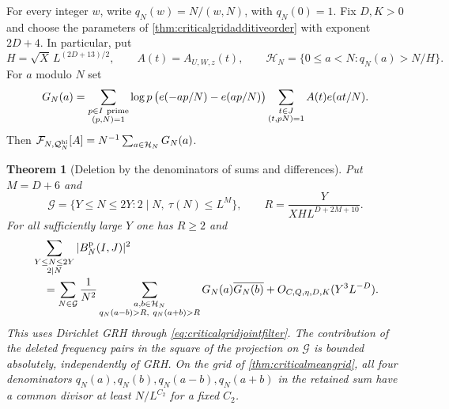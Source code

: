 \documentclass[11pt,a4paper]{article}
\numberwithin{equation}{section}
\newtheorem{theorem}{Theorem}[section]
\begin{document}
For every integer $w$, write $q_N(w)=N/(w,N)$, with
$q_N(0)=1$. Fix $D,K>0$ and choose the parameters of
\cref{thm:criticalgridadditiveorder} with exponent $2D+4$.
In particular, put
\[
 H=\sqrt X\,L^{(2D+13)/2},\qquad A(t)=A_{U,W,z}(t),
 \qquad
 \mathcal H_N=\{0\le a<N:q_N(a)>N/H\}.
\]
For $a$ modulo $N$ set
\begin{equation}
 G_N(a)=
 \sum_{\substack{p\in I\ {\rm prime}\\(p,N)=1}}
  \log p\,\bigl(e(-ap/N)-e(ap/N)\bigr)
  \sum_{\substack{t\in J\\(t,pN)=1}} A(t)e(at/N).
 \label{eq:criticalgridpaircoefficient}
\end{equation}
Then $\mathcal F_{N,\mathcal Q_N^{\rm hi}}[A]
=N^{-1}\sum_{a\in\mathcal H_N}G_N(a)$.

\begin{theorem}[Deletion by the denominators of sums and differences]
\label{thm:criticalgridpairorder}
Put $M=D+6$ and
\[
 \mathcal G=\{Y\le N\le2Y:2\mid N,\ \tau(N)\le L^M\},
 \qquad
 R=\frac{Y}{XH L^{D+2M+10}} .
\]
For all sufficiently large $Y$ one has $R\ge2$ and
\begin{align}
 &\sum_{\substack{Y\le N\le2Y\\2\mid N}}|B_N^{\rm p}(I,J)|^2
 \notag\\[-2pt]
 &\quad=
 \sum_{N\in\mathcal G}\frac{1}{N^2}
 \sum_{\substack{a,b\in\mathcal H_N\\
             q_N(a-b)>R,\ q_N(a+b)>R}}G_N(a)\overline{G_N(b)}
 +O_{C,Q,\eta,D,K}(Y^3 L^{-D}).
 \label{eq:criticalgridpairmoment}
\end{align}
This uses Dirichlet GRH through \cref{eq:criticalgridjointfilter}.
The contribution of the deleted frequency pairs in the square of
the projection on $\mathcal G$ is bounded absolutely, independently
of GRH. On the grid of \cref{thm:criticalmeangrid}, all four
denominators $q_N(a),q_N(b),q_N(a-b),q_N(a+b)$ in the retained sum
have a common divisor at least $N/L^{C_2}$ for a fixed $C_2$.
\end{theorem}
\end{document}
